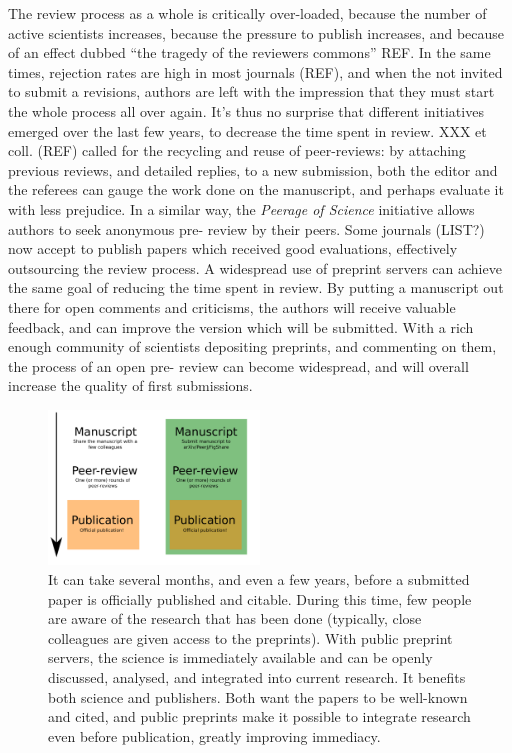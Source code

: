 \documentclass[letterpaper,twocolumn,superscriptaddress,showkeys]{revtex4}
\begin{document}
The review process as a whole is critically over-loaded, because the number of
active scientists increases, because the pressure to publish increases, and
because of an effect dubbed ``the tragedy of the reviewers commons'' REF.  In
the same times, rejection rates are high in most journals (REF), and when the
not invited to submit a revisions, authors are left with the impression that
they must start the whole process all over again. It's thus no surprise that
different initiatives emerged over the last few years, to decrease the time
spent in review. XXX et coll. (REF) called for the recycling and reuse of
peer-reviews: by attaching previous reviews, and detailed replies, to a new
submission, both the editor and the referees can gauge the work done on the
manuscript, and perhaps evaluate it with less prejudice. In a similar way, the
\emph{Peerage of Science} initiative allows authors to seek anonymous pre-
review by their peers. Some journals (LIST?) now accept to publish papers
which received good evaluations, effectively outsourcing the review process. A
widespread use of preprint servers can achieve the same goal of reducing the
time spent in review. By putting a manuscript out there for open comments and
criticisms, the authors will receive valuable feedback, and can improve the
version which will be submitted. With a rich enough community of scientists
depositing preprints, and commenting on them, the process of an open pre-
review can become widespread, and will overall increase the quality of first
submissions.

\begin{figure}[ht!] \centering\includegraphics[width=0.50\textwidth]{map.pdf}
\caption { It can take several months, and even a few years, before a submitted
paper is officially published and citable. During this time, few people are
aware of the research that has been done (typically, close colleagues are
given access to the preprints). With public preprint servers, the science is
immediately available and can be openly discussed, analysed, and integrated
into current research. It benefits both science and publishers. Both want the
papers to be well-known and cited, and public preprints make it possible to
integrate research even before publication, greatly improving immediacy.  }
\label{fig:map}
\end{figure}
\end{document}
